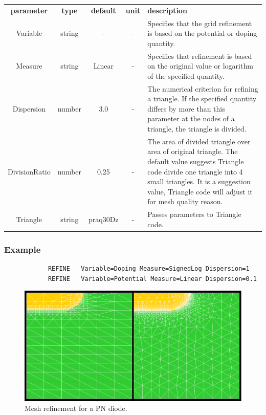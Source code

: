 \documentclass[11pt,pdftex]{article}
\begin{document}
\small \noindent\begin{longtable}{ccccp{7cm}}
\textbf{parameter}   & \textbf{type}  & \textbf{default} & \textbf{unit} & \textbf{description} \\
Variable    & string  & -       & -   & Specifies that the grid refinement is based on the potential or doping quantity. \\
Measure     & string  & Linear  & -   & Specifies that refinement is based on the original value or logarithm of the
                                        specified quantity.\\
Dispersion  & number  & 3.0     & -   & The numerical criterion for refining a triangle. If the specified
                                        quantity differs by more than this parameter at the nodes of a triangle,
                                        the triangle is divided.\\
DivisionRatio & number & 0.25   & -   & The area of divided triangle over area of original triangle.
                                        The default value suggests Triangle code divide one triangle into 4 small triangles.
                                        It is a suggestion value, Triangle code will adjust it for mesh quality reason.\\
Triangle    & string  &praq30Dz & -   & Passes parameters to Triangle code.\\
\end{longtable}
\normalsize

\subsubsection*{Example}
\begin{verbatim}
            REFINE   Variable=Doping Measure=SignedLog Dispersion=1
            REFINE   Variable=Potential Measure=Linear Dispersion=0.1
\end{verbatim}

\begin{figure}[ht]
\centering
\includegraphics[scale=0.3]{refine.png}
\caption{Mesh refinement for a PN diode.}
\end{figure}
\end{document}
